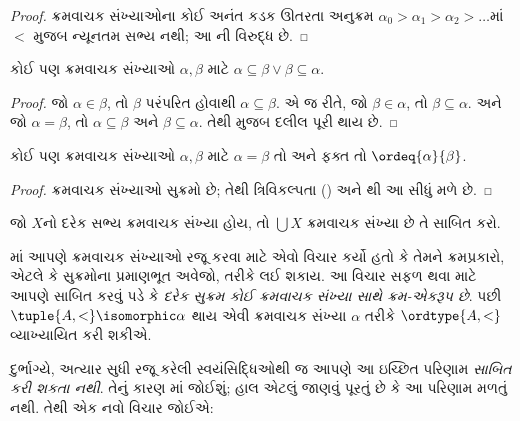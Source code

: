\begin{proof}
ક્રમવાચક સંખ્યાઓના કોઈ અનંત કડક
ઊતરતા અનુક્રમ
$\alpha_0 > \alpha_1 > \alpha_2 > \ldots$માં
$<$ મુજબ ન્યૂનતમ સભ્ય નથી;
આ ની
વિરુદ્ધ છે.
\end{proof}

\begin{prop}
કોઈ પણ ક્રમવાચક સંખ્યાઓ
$\alpha, \beta$ માટે
$\alpha \subseteq \beta \lor \beta \subseteq \alpha$.
\end{prop}

\begin{proof}
જો $\alpha \in \beta$, તો $\beta$
પરંપરિત હોવાથી $\alpha \subseteq \beta$.
એ જ રીતે, જો $\beta \in \alpha$,
તો $\beta \subseteq
\alpha$. અને જો $\alpha = \beta$,
તો $\alpha \subseteq \beta$ અને
$\beta \subseteq \alpha$.
તેથી  મુજબ
દલીલ પૂરી થાય છે.
\end{proof}

\begin{prop}
કોઈ પણ ક્રમવાચક સંખ્યાઓ
$\alpha, \beta$ માટે
$\alpha = \beta$ તો અને ફક્ત તો
$\ordeq{\alpha}{\beta}$.
\end{prop}

\begin{proof}
ક્રમવાચક સંખ્યાઓ સુક્રમો છે;
તેથી ત્રિવિકલ્પતા
() અને
થી
આ સીધું મળે છે.
\end{proof}

\begin{prob}
જો $X$નો દરેક સભ્ય ક્રમવાચક
સંખ્યા હોય, તો $\bigcup X$
ક્રમવાચક સંખ્યા છે તે સાબિત કરો.
\end{prob}
\endgroup

\begingroup
\makeatletter{}\makeatother

\label{guunit:OLP-0554}


માં આપણે ક્રમવાચક સંખ્યાઓ રજૂ કરવા માટે
એવો વિચાર કર્યો હતો કે તેમને ક્રમપ્રકારો, એટલે કે સુક્રમોના પ્રમાણભૂત
અવેજો, તરીકે લઈ શકાય. આ વિચાર સફળ થવા માટે આપણે સાબિત કરવું પડે કે
\emph{દરેક સુક્રમ કોઈ ક્રમવાચક સંખ્યા સાથે ક્રમ-એકરૂપ છે}.
પછી $\tuple{A, <} \isomorphic \alpha$ થાય એવી ક્રમવાચક
સંખ્યા $\alpha$ તરીકે $\ordtype{A, <}$ વ્યાખ્યાયિત કરી શકીએ.

દુર્ભાગ્યે, અત્યાર સુધી રજૂ કરેલી સ્વયંસિદ્ધિઓથી જ આપણે આ ઇચ્છિત
પરિણામ \emph{સાબિત કરી શકતા નથી}. તેનું કારણ
માં જોઈશું; હાલ એટલું જાણવું
પૂરતું છે કે આ પરિણામ મળતું નથી. તેથી એક નવો વિચાર જોઈએ:

